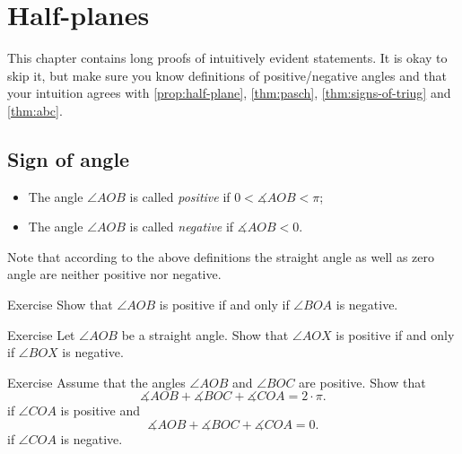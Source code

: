 \chapter{Half-planes}\label{chap:half-planes}

This chapter contains long proofs of intuitively evident statements.
It is okay to skip it, but make sure you know definitions of positive/negative angles and that your intuition agrees with \ref{prop:half-plane}, \ref{thm:pasch}, \ref{thm:signs-of-triug} and \ref{thm:abc}.

 
                            
\section*{Sign of angle}

\begin{itemize}
\item The angle $\angle A O B$ is called \emph{positive} 
if $0<\measuredangle A O B<\pi$;
\item The  angle $\angle A O B$ is called \emph{negative} 
if $\measuredangle A O B<0$.
\end{itemize}

Note that according to the above definitions the straight angle as well as zero angle 
are neither positive nor negative.

\begin{thm}{Exercise}\label{ex:AOB+<=>BOA-}
Show that $\angle A O B$ is positive if and only if $\angle B O A$ is negative.
\end{thm}

\begin{thm}{Exercise}\label{ex:straight-sign}
Let $\angle AOB$ be a straight angle.
Show that $\angle AOX$ is positive 
if and only if $\angle BOX$ is negative.
\end{thm}

\begin{thm}{Exercise}\label{ex:PP(PN)}
Assume that the angles $\angle AOB$ and $\angle BOC$ are positive. 
Show that
$$\measuredangle AOB+\measuredangle BOC+\measuredangle COA=2\cdot\pi.$$
if $\angle COA$ is positive
and
$$\measuredangle AOB+\measuredangle BOC+\measuredangle COA=0.$$
if $\angle COA$ is negative.
\end{thm}




